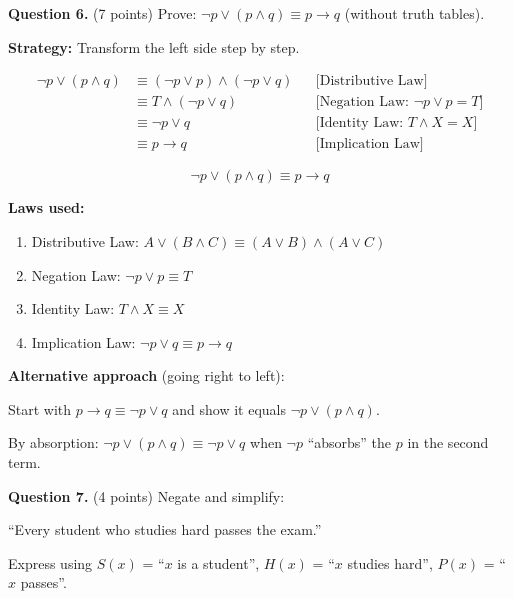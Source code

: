 \documentclass[11pt,a4paper]{article}
\begin{document}
\vspace{15pt}

\textbf{Question 6.} (7 points) Prove: $\neg p \lor (p \land q) \equiv p \to q$ (without truth tables).

\begin{solnbox}
\textbf{Strategy:} Transform the left side step by step.

\begin{align*}
\neg p \lor (p \land q) &\equiv (\neg p \lor p) \land (\neg p \lor q) && \text{[Distributive Law]} \\
&\equiv T \land (\neg p \lor q) && \text{[Negation Law: } \neg p \lor p = T \text{]} \\
&\equiv \neg p \lor q && \text{[Identity Law: } T \land X = X \text{]} \\
&\equiv p \to q && \text{[Implication Law]}
\end{align*}

$$\boxed{\neg p \lor (p \land q) \equiv p \to q}$$

\textbf{Laws used:}
\begin{enumerate}[noitemsep]
    \item Distributive Law: $A \lor (B \land C) \equiv (A \lor B) \land (A \lor C)$
    \item Negation Law: $\neg p \lor p \equiv T$
    \item Identity Law: $T \land X \equiv X$
    \item Implication Law: $\neg p \lor q \equiv p \to q$
\end{enumerate}

\textbf{Alternative approach} (going right to left):

Start with $p \to q \equiv \neg p \lor q$ and show it equals $\neg p \lor (p \land q)$.

By absorption: $\neg p \lor (p \land q) \equiv \neg p \lor q$ when $\neg p$ ``absorbs'' the $p$ in the second term.
\end{solnbox}

\vspace{15pt}

\textbf{Question 7.} (4 points) Negate and simplify:

``Every student who studies hard passes the exam.''

Express using $S(x)$ = ``$x$ is a student'', $H(x)$ = ``$x$ studies hard'', $P(x)$ = ``$x$ passes''.
\end{document}
